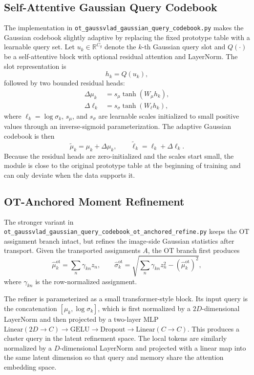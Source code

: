 \documentclass[journal]{IEEEtran}
\begin{document}
\subsection{Self-Attentive Gaussian Query Codebook}
The implementation in \texttt{ot\_gaussvlad\_gaussian\_query\_codebook.py} makes the Gaussian codebook slightly adaptive by replacing the fixed prototype table with a learnable query set. Let \(u_k \in \mathbb{R}^{C_g}\) denote the \(k\)-th Gaussian query slot and \(Q(\cdot)\) be a self-attentive block with optional residual attention and LayerNorm. The slot representation is
\begin{equation}
 h_k = Q(u_k),
\end{equation}
followed by two bounded residual heads:
\begin{align}
\Delta \mu_k &= s_\mu \tanh(W_\mu h_k), \\
\Delta \ell_k &= s_\sigma \tanh(W_\ell h_k),
\end{align}
where \(\ell_k = \log \sigma_k\), \(s_\mu\), and \(s_\sigma\) are learnable scales initialized to small positive values through an inverse-sigmoid parameterization. The adaptive Gaussian codebook is then
\begin{equation}
\tilde{\mu}_k = \mu_k + \Delta \mu_k,\qquad
\tilde{\ell}_k = \ell_k + \Delta \ell_k.
\end{equation}
Because the residual heads are zero-initialized and the scales start small, the module is close to the original prototype table at the beginning of training and can only deviate when the data supports it.

\subsection{OT-Anchored Moment Refinement}
The stronger variant in \texttt{ot\_gaussvlad\_gaussian\_query\_codebook\_ot\_anchored\_refine.py} keeps the OT assignment branch intact, but refines the image-side Gaussian statistics after transport. Given the transported assignments \(A\), the OT branch first produces
\begin{equation}
\hat{\mu}^{\mathrm{ot}}_k = \sum_n \gamma_{kn} z_n,\qquad
\hat{\sigma}^{\mathrm{ot}}_k = \sqrt{\sum_n \gamma_{kn} z_n^2 - (\hat{\mu}^{\mathrm{ot}}_k)^2},
\end{equation}
where \(\gamma_{kn}\) is the row-normalized assignment.

The refiner is parameterized as a small transformer-style block. Its input query is the concatenation \([\mu_k,\log\sigma_k]\), which is first normalized by a \(2D\)-dimensional LayerNorm and then projected by a two-layer MLP \(\mathrm{Linear}(2D \to C)\!\rightarrow\!\mathrm{GELU}\!\rightarrow\!\mathrm{Dropout}\!\rightarrow\!\mathrm{Linear}(C \to C)\). This produces a cluster query in the latent refinement space. The local tokens are similarly normalized by a \(D\)-dimensional LayerNorm and projected with a linear map into the same latent dimension so that query and memory share the attention embedding space.
\end{document}
